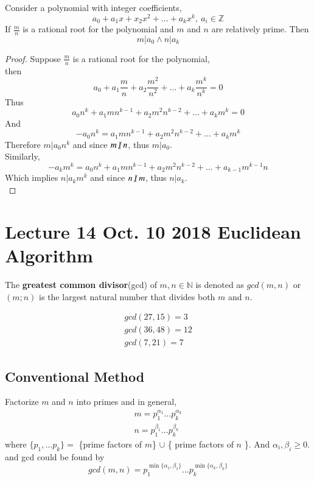 \documentclass[10pt]{article}
\begin{document}
	\begin{theorem}
		Consider a polynomial with integer coefficients, 
		\[
			a_0 + a_1 x + x_2 x^2 + \dots + a_k x^k,\ a_i \in \mathbb{Z}
		\]
		If $\frac{m}{n}$ is a rational root for the polynomial and $m$ and $n$ are relatively prime. Then
		\[
			m | a_0 \land n | a_k
		\]
	\end{theorem}
	\begin{proof}
		Suppose $\frac{m}{n}$ is a rational root for the polynomial, \\
		then 
		\[
			a_0 + a_1 \frac{m}{n} + a_2 \frac{m^2}{n^2} + \dots + a_k \frac{m^k}{n^k} = 0
		\]
		Thus 
		\[
			a_0 n^k + a_1 m n^{k-1} + a_2 m^2 n^{k-2} + \dots + a_k m^k = 0
		\]
		And 
		\[
			- a_0 n^k = a_1 m n^{k-1} + a_2 m^2 n^{k-2} + \dots + a_k m^k
		\]
		Therefore $m | a_0 n^k$ and since $m \centernot | n$, thus $m | a_0$. \\
		Similarly,
		\[
			- a_k m^k = a_0 n^k + a_1 m n^{k-1} + a_2 m^2 n^{k-2} + \dots + a_{k-1}m^{k-1}n
		\]
		Which implies $n | a_k m^k$ and since $n \centernot | m$, thus $n | a_k$. \\
	\end{proof}
	
	\section{Lecture 14 Oct. 10 2018 Euclidean Algorithm}
		\begin{definition}
			The \textbf{greatest common divisor}(gcd) of $m, n \in \mathbb{N}$ is denoted as $gcd(m,n)$ or $(m;n)$ is the largest natural number that divides both $m$ and $n$.
		\end{definition}
		\begin{example}
			\begin{gather*}
				gcd(27, 15) = 3 \\
				gcd(36, 48) = 12 \\
				gcd(7, 21) = 7
			\end{gather*}
		\end{example}
		\subsection{Conventional Method}
		\par Factorize $m$ and $n$ into primes and in general,
		\begin{gather*}
			m = p_1^{\alpha_1} \dots p_k^{\alpha_k} \\
			n = p_1^{\beta_1} \dots p_k^{\beta_k}
		\end{gather*}
		where $\{p_1, \dots p_k \} = $ \{prime factors of $m$\} $\cup$ \{ prime factors of $n$ \}. And $\alpha_i, \beta_i \geq 0$.
		and gcd could be found by
		\[
			gcd(m,n) = p_1^{\min\{\alpha_1, \beta_1\}} \dots p_k^{\min\{\alpha_k, \beta_k\}}
		\]
		
\end{document}

